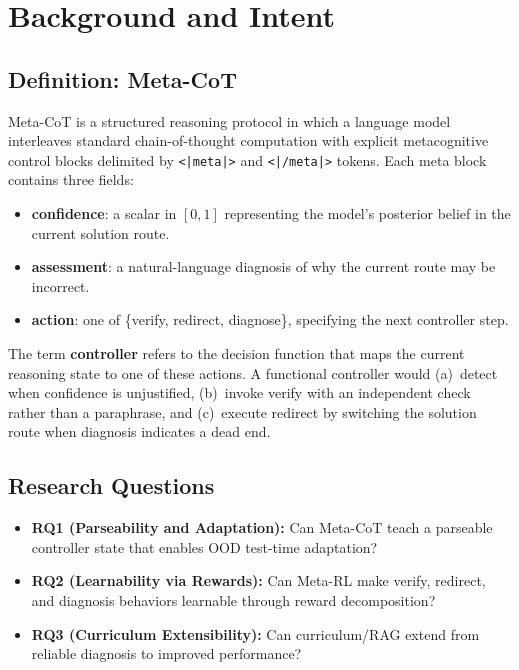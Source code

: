 \documentclass[11pt,a4paper]{article}
\newcommand{\tok}[1]{\texttt{#1}}
\begin{document}
\section{Background and Intent}

\subsection{Definition: Meta-CoT}

Meta-CoT is a structured reasoning protocol in which a language model interleaves standard chain-of-thought computation with explicit metacognitive control blocks delimited by \tok{<|meta|>} and \tok{<|/meta|>} tokens. Each meta block contains three fields:

\begin{itemize}[nosep]
  \item \textbf{confidence}: a scalar in $[0, 1]$ representing the model's posterior belief in the current solution route.
  \item \textbf{assessment}: a natural-language diagnosis of why the current route may be incorrect.
  \item \textbf{action}: one of \{verify, redirect, diagnose\}, specifying the next controller step.
\end{itemize}

The term \textbf{controller} refers to the decision function that maps the current reasoning state to one of these actions. A functional controller would (a)~detect when confidence is unjustified, (b)~invoke verify with an independent check rather than a paraphrase, and (c)~execute redirect by switching the solution route when diagnosis indicates a dead end.

\subsection{Research Questions}

\begin{itemize}[nosep]
  \item \textbf{RQ1 (Parseability and Adaptation):} Can Meta-CoT teach a parseable controller state that enables OOD test-time adaptation?
  \item \textbf{RQ2 (Learnability via Rewards):} Can Meta-RL make verify, redirect, and diagnosis behaviors learnable through reward decomposition?
  \item \textbf{RQ3 (Curriculum Extensibility):} Can curriculum/RAG extend from reliable diagnosis to improved performance?
\end{itemize}
\end{document}
